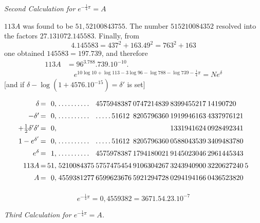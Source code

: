 
\begin{center}\emph{Second Calculation for $e^{-\frac14\pi}=A$}\end{center}

$113A$ was found to be $51{,}52100843755$. The number $515210084352$ resolved into the factors $27.131072.145583$.
Finally, from
\[
4.145583=437^2+163.49^2=763^2+163
\]
one obtained
$145583=197.739$, and therefore
\[
\begin{aligned}113A&=96^3.788.739.10^{-10}.\\[7pt]&\quad{}e^{10\log10+\log113-3\log96-\log788-\log739-\frac14\pi}=Ne^\delta\end{aligned}
\]
[and if $\delta-\log(1+4576.10^{-15})=\delta'$ is set]

\begingroup\footnotesize\setlength{\arraycolsep}{1pt}\renewcommand{\arraystretch}{1.12}\[
\begin{array}{r@{\,=\,}r@{\;}l@{\hspace{2pt}}l@{\hspace{2pt}}l@{\hspace{2pt}}l@{\hspace{2pt}}l@{\hspace{2pt}}l}
\delta & 0{,} & .\,.\,.\,.\,.\,.\,.\,.\,.\,. & 4575948387 & 0747214839 & 8399455217 & 14190720 & \\[5pt]
-\delta' & 0{,} & .\,.\,.\,.\,.\,.\,.\,.\,.\,. & .\,.\,.\,.\,.\,51612 & 8205796360 & 1919946163 & 4337976121 & \\[5pt]
+\tfrac12\delta'\delta' & 0{,} &  &  &  & 1331941624 & 0928492341 & \\[5pt]
1-e^{\delta'} & 0{,} & .\,.\,.\,.\,.\,.\,.\,.\,.\,. & .\,.\,.\,.\,.\,51612 & 8205796360 & 0588043539 & 3409483780 & \\[5pt]
e^\delta & 1{,} & .\,.\,.\,.\,.\,.\,.\,.\,.\,. & 4575978387 & 1794180021 & 9145023046 & 2961445343 & \\[5pt]
113A & 51{,} & 5210084375 & 5757475454 & 9106304267 & 3243940900 & 3220627240 & 5\\[5pt]
A & 0{,} & 4559381277 & 6599623676 & 5921294728 & 0294194166 & 0436523820 & \\[5pt]
\end{array}
\]\endgroup

\[
e^{-\frac14\pi}=0{,}4559382=3671.54.23.10^{-7}
\]

\begin{center}\emph{Third Calculation for $e^{-\frac14\pi}=A$.}\end{center}

